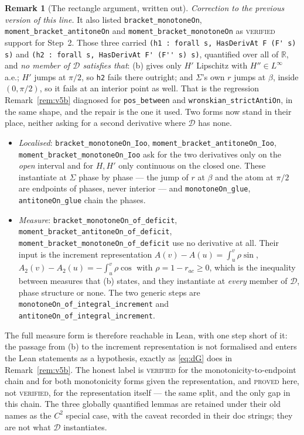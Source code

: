\documentclass[11pt]{article}
\theoremstyle{definition}
\newtheorem{remark}[theorem]{Remark}
\newcommand{\R}{\mathbb{R}}
\newcommand{\Sig}{\Sigma}
\begin{document}
\begin{remark}[The rectangle argument, written out]
\emph{Correction to the previous version of this line.} It also listed
\verb|bracket_monotoneOn|, \verb|moment_bracket_antitoneOn| and
\verb|moment_bracket_monotoneOn| as \textsc{verified} support for Step~2. Those three carried
\verb|(h1 : forall s, HasDerivAt F (F' s) s)| and
\verb|(h2 : forall s, HasDerivAt F' (F'' s) s)|,
quantified over all of $\R$, and \emph{no member of $\mathcal D$ satisfies that}: (b) gives
only $H'$ Lipschitz with $H''\in L^\infty$ a.e.; $H'$ jumps at $\pi/2$, so \verb|h2| fails
there outright; and $\Sig$'s own $r$ jumps at $\beta$, inside $(0,\pi/2)$, so it fails at an
interior point as well. That is the regression Remark~\ref{rem:v5b} diagnosed for
\verb|pos_between| and \verb|wronskian_strictAntiOn|, in the same shape, and the repair is
the one it used. Two forms now stand in their place, neither asking for a second derivative
where $\mathcal D$ has none.
\begin{itemize}
\item \emph{Localised}: \verb|bracket_monotoneOn_Ioo|, \verb|moment_bracket_antitoneOn_Ioo|,
\verb|moment_bracket_monotoneOn_Ioo| ask for the two derivatives only on the \emph{open}
interval and for $H,H'$ only continuous on the closed one. These instantiate at $\Sig$ phase
by phase --- the jump of $r$ at $\beta$ and the atom at $\pi/2$ are endpoints of phases,
never interior --- and \verb|monotoneOn_glue|, \verb|antitoneOn_glue| chain the phases.
\item \emph{Measure}: \verb|bracket_monotoneOn_of_deficit|,
\verb|moment_bracket_antitoneOn_of_deficit|, \verb|moment_bracket_monotoneOn_of_deficit| use
no derivative at all. Their input is the increment representation
$A(v)-A(u)=\int_u^v\rho\sin$, $A_2(v)-A_2(u)=-\int_u^v\rho\cos$ with $\rho=1-r_{ac}\ge0$,
which is the inequality between measures that (b) states, and they instantiate at
\emph{every} member of $\mathcal D$, phase structure or none. The two generic steps are
\verb|monotoneOn_of_integral_increment| and \verb|antitoneOn_of_integral_increment|.
\end{itemize}
The full measure form is therefore reachable in Lean, with one step short of it: the passage
from (b) to the increment representation is not formalised and enters the Lean statements as
a hypothesis, exactly as \eqref{eq:dG} does in Remark~\ref{rem:v5b}. The honest label is
\textsc{verified} for the monotonicity-to-endpoint chain and for both monotonicity forms
given the representation, and \textsc{proved} here, not \textsc{verified}, for the
representation itself --- the same split, and the only gap in this chain. The three
globally quantified lemmas are retained under their old names as the $C^2$ special case, with
the caveat recorded in their doc strings; they are not what $\mathcal D$ instantiates.


\end{remark}
\end{document}
